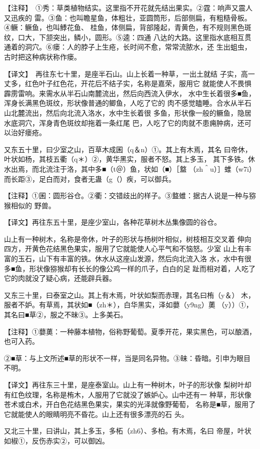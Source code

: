 \documentclass[a4paper,12pt,UTF8,twoside]{ctexbook}
\begin{document}
【注释】　①秀：草类植物结实。这里指不开花就先结出果实。②霆：响声又震人又迅疾的 雷。③鱼：也叫瞻星鱼，体粗壮，亚圆筒形，后部侧扁，有粗糙骨板。④鳜：鳜鱼，也叫鯚花鱼、 桂鱼，体侧扁，背部隆起，青黄色，有不规则黑色斑纹，口大，下颔突出，鳞小，圆形。⑤逵：四通 八达的大路。这里指水底相互贯通着的洞穴。⑥瘘：人的脖子上生疮，长时间不愈，常常流脓水，还 生出蛆虫，古时把这种病状称作瘘。

【译文】　再往东七十里，是座半石山。山上长着一种草，一出土就结 子实，高一丈多，红色叶子红色花，开花后不结子实，名称是嘉荣，服用它 就能使人不畏惧霹雳雷响。来需水从半石山南麓流出，然后向西流入伊水， 水中生长着很多■鱼，浑身长满黑色斑纹，形状像普通的鲫鱼，人吃了它的 肉不感觉瞌睡。合水从半石山北麓流出，然后向北流入洛水，水中生长着很 多鱼，形状像一般的鳜鱼，隐居水底洞穴，浑身青色斑纹却拖着一条红尾 巴，人吃了它的肉就不患痈肿病，还可以治好瘘疮。

又东五十里，曰少室之山，百草木成囷（q＆n）①。其上有木焉，其名 曰帝休，叶状如杨，其枝五衢（q＊）②，黄华黑实，服者不怒。其上多玉， 其下多铁。休水出焉，而北流注于洛，其中多■（t＠）鱼，状如（■）［盩 （zh＾u）］蜼（w7i）而长距③，足白而对，食者无蛊（g（）疾，可以御兵。

【注释】①囷：圆形谷仓。②衢：交错歧出的样子。③盩蜼：据古人说是一种与猕猴相似的 野兽。

【译文】再往东五十里，是座少室山，各种花草树木丛集像圆的谷仓。

山上有一种树木，名称是帝休，叶子的形状与杨树叶相似，树枝相互交叉着 伸向四方，开黄色花结黑色果实，服用了它就能使人心平气和不恼怒。少室 山上有丰富的玉石，山下有丰富的铁。休水从这座山发源，然后向北流入洛 水，水中有很多■鱼，形状像猕猴却有长长的像公鸡一样的爪子，白白的足 趾而相对着，人吃了它的肉就没了疑心病，还能辟兵器。

又东三十里，曰泰室之山。其上有木焉，叶状如梨而赤理，其名曰栯（y＆） 木，服者不妒。有草焉，其状如■（zh＊），白华黑实，泽如蘡（y9ng）薁 （y））①，其名曰■草②，服之不昧③。上多美石。

【注释】①蘡薁：一种藤本植物，俗称野葡萄。夏季开花，果实黑色，可以酿酒，也可入药。

②■草：与上文所述■草的形状不一样，当是同名异物。③昧：昏暗。引申为眼目不明。

【译文】再往东三十里，是座泰室山。山上有一种树木，叶子的形状像 梨树叶却有红色纹理，名称是栯木，人服用了它就没了嫉妒心。山中还有一 种草，形状像苍术或白术，开白色花结黑色果实，果实的光泽就像野葡萄， 名称是■草，服用了它就能使人的眼睛明亮不昏花。山上还有很多漂亮的石 头。

又北三十里，曰讲山，其上多玉，多柘（zh6）、多柏。有木焉，名曰 帝屋，叶状如椒①，反伤赤实②，可以御凶。
\end{document}
